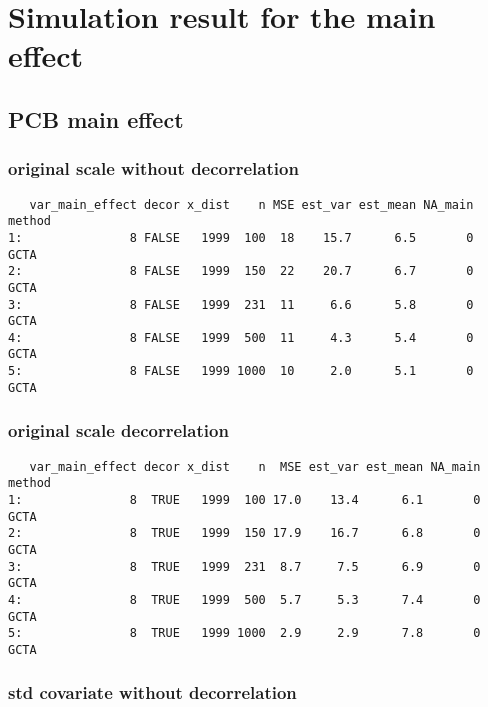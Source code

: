 \documentclass[]{article}
\begin{document}
\section{Simulation result for the main
effect}\label{simulation-result-for-the-main-effect}

\subsection{PCB main effect}\label{pcb-main-effect}

\subsubsection{original scale without
decorrelation}\label{original-scale-without-decorrelation}

\begin{verbatim}
   var_main_effect decor x_dist    n MSE est_var est_mean NA_main method
1:               8 FALSE   1999  100  18    15.7      6.5       0   GCTA
2:               8 FALSE   1999  150  22    20.7      6.7       0   GCTA
3:               8 FALSE   1999  231  11     6.6      5.8       0   GCTA
4:               8 FALSE   1999  500  11     4.3      5.4       0   GCTA
5:               8 FALSE   1999 1000  10     2.0      5.1       0   GCTA
\end{verbatim}

\subsubsection{original scale
decorrelation}\label{original-scale-decorrelation}

\begin{verbatim}
   var_main_effect decor x_dist    n  MSE est_var est_mean NA_main method
1:               8  TRUE   1999  100 17.0    13.4      6.1       0   GCTA
2:               8  TRUE   1999  150 17.9    16.7      6.8       0   GCTA
3:               8  TRUE   1999  231  8.7     7.5      6.9       0   GCTA
4:               8  TRUE   1999  500  5.7     5.3      7.4       0   GCTA
5:               8  TRUE   1999 1000  2.9     2.9      7.8       0   GCTA
\end{verbatim}

\subsubsection{std covariate without
decorrelation}\label{std-covariate-without-decorrelation}
\end{document}

